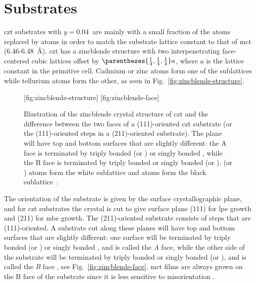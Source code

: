 \section[\ce{Cd_{1-y}Zn_yTe} Substrates]{ Substrates%
       }

\Acl{czt} substrates with $y=\SI{0.04}{}$ are mainly  with a small fraction of the  atoms replaced by  atoms in order to match the substrate lattice constant to that of \acl{mct} (\SI{6.46}{}-\SI{6.48}{\angstrom}). \Ac{czt} has a zincblende structure with two interpenetrating face-centered cubic lattices offset by $\parentheses{\frac{1}{4},\frac{1}{4},\frac{1}{4}}a$, where $a$ is the lattice constant in the primitive cell. Cadmium or zinc atoms form one of the sublattices while tellurium atoms form the other, as seen in Fig.~\ref{fig:zincblende-structure}.

\begin{figure}[htbp]
    \centering
    [fig:zincblende-structure]
    \hfill
    [fig:zincblende-face]
    \caption[Crystal structure of \ac{czt}.]{Illustration of  the zincblende crystal structure of \ac{czt} and  the difference between the two faces of a (111)-oriented \ac{czt} substrate (or the (111)-oriented steps in a (211)-oriented substrate). The plane will have top and bottom surfaces that are slightly different: the A face is terminated by triply bonded  (or ) or singly bonded , while the B face is terminated by triply bonded  or singly bonded  (or ).  (or ) atoms form the white sublattice and  atoms form the black sublattice \citep[Adapted from][]{sivananthan1986relation}.}
    \label{fig:zincblende}
\end{figure}

The orientation of the substrate is given by the surface crystallographic plane, and for \ac{czt} substrates the crystal is cut to give surface plane (111) for \ac{lpe} growth and (211) for \ac{mbe} growth. The (211)-oriented substrate consists of steps that are (111)-oriented. A substrate cut along these planes will have top and bottom surfaces that are slightly different: one surface will be terminated by triply bonded  (or ) or singly bonded , and is called the \emph{A} face, while the other side of the substrate will be terminated by triply bonded  or singly bonded  (or ), and is called the \emph{B} face \citep{sivananthan1986relation}, see Fig.~\ref{fig:zincblende-face}. \Ac{mct} films are always grown on the B face of the substrate since it is less sensitive to misorientation \citep{parker1988terracing, edwall1984liquid}.%

